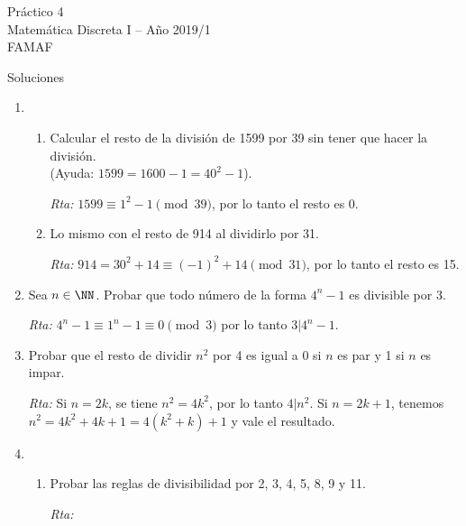 \documentclass[12pt,spanish,makeidx]{amsbook}
\newcommand{\rta}{\noindent\textit{Rta: }}
\begin{document}
	
{\bf \begin{center} Práctico 4 \\ Matemática Discreta I -- Año 2019/1 \\ FAMAF \end{center}}

{\bf \begin{center} Soluciones \end{center}}

\begin{enumerate}
	\item  
	\begin{enumerate}
		\item Calcular el resto de la división de 1599 por 39 sin tener que hacer la división. \\(Ayuda: $1599=1600-1=40^2-1$).
		
		\rta $1599\equiv 1^2-1\pmod{ 39}$, por lo tanto el resto es 0.
		
		\item Lo mismo con el resto de 914 al dividirlo por 31.
		
		\rta $914=30^2+14\equiv (-1)^2+14 \pmod{ 31}$, por lo tanto el resto es 15.
	\end{enumerate}
	
	
	\smallskip
	\item Sea $n\in\NN$. Probar que todo número de la forma $4^n-1$ es divisible por 3.
	
	\rta $4^n-1\equiv 1^n-1 \equiv 0 \pmod 3$ por lo tanto $3\vert 4^n-1$.
	
	\smallskip
	\item Probar que el resto de dividir $n^2$ por 4 es igual a 0 si $n$ es par y 1 si $n$ es impar.
		
	\rta  Si $n=2k$, se tiene $n^2=4k^2$, por lo tanto $4\vert n^2$. Si $n=2k+1$, tenemos $n^2=4k^2+4k+1=4(k^2+k)+1$ y vale el resultado.
	
	
	
	\smallskip
	\item
	\begin{enumerate}
		\item
		Probar las reglas de divisibilidad por 2, 3, 4, 5, 8, 9 y 11.%
			
		\rta 
		

\end{enumerate}
\end{enumerate}
\end{document}
